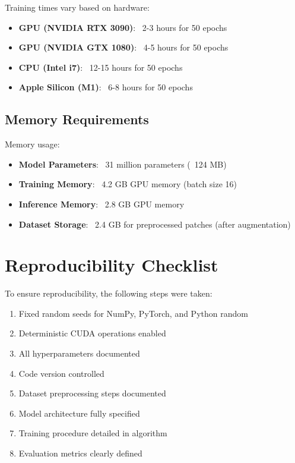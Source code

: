 \documentclass[12pt,a4paper]{article}
\begin{document}
Training times vary based on hardware:
\begin{itemize}
    \item \textbf{GPU (NVIDIA RTX 3090)}: ~2-3 hours for 50 epochs
    \item \textbf{GPU (NVIDIA GTX 1080)}: ~4-5 hours for 50 epochs
    \item \textbf{CPU (Intel i7)}: ~12-15 hours for 50 epochs
    \item \textbf{Apple Silicon (M1)}: ~6-8 hours for 50 epochs
\end{itemize}

\subsection{Memory Requirements}

Memory usage:
\begin{itemize}
    \item \textbf{Model Parameters}: ~31 million parameters (~124 MB)
    \item \textbf{Training Memory}: ~4.2 GB GPU memory (batch size 16)
    \item \textbf{Inference Memory}: ~2.8 GB GPU memory
    \item \textbf{Dataset Storage}: ~2.4 GB for preprocessed patches (after augmentation)
\end{itemize}

\section{Reproducibility Checklist}

To ensure reproducibility, the following steps were taken:

\begin{enumerate}
    \item Fixed random seeds for NumPy, PyTorch, and Python random
    \item Deterministic CUDA operations enabled
    \item All hyperparameters documented
    \item Code version controlled
    \item Dataset preprocessing steps documented
    \item Model architecture fully specified
    \item Training procedure detailed in algorithm
    \item Evaluation metrics clearly defined
\end{enumerate}
\end{document}
